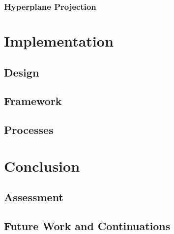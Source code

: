 \documentclass[a4paper, notitlepage]{report}
\begin{document}
\section{Hyperplane Projection}
\label{sec:org9861a95}
\part{Implementation}
\label{sec:org43e6129}
\chapter{Design}
\label{sec:org0283d52}
\chapter{Framework}
\label{sec:orgaab64df}
\chapter{Processes}
\label{sec:orgb17521e}
\part{Conclusion}
\label{sec:org7848719}
\chapter{Assessment}
\label{sec:org4aad5d8}
\chapter{Future Work and Continuations}
\label{sec:org50e5776}
\printbibliography
\appendix
\end{document}
